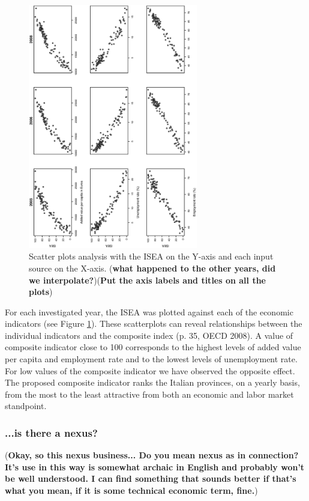 \documentclass[10pt]{article}
\theoremstyle{definition}
\theoremstyle{plain}
\begin{document}
\begin{figure}[tbp]
\centering
	\includegraphics[width=0.66\textwidth, angle=270]{sensitivity.eps}
\caption{Scatter plots analysis with the ISEA on the Y-axis and each input source on the X-axis. (\textbf{what happened to the other years, did we interpolate?})(\textbf{Put the axis labels and titles on all the plots})}
	\label{fig4}
\end{figure}

For each investigated year, the ISEA was plotted against each of the economic indicators  (see Figure \ref{fig4}). These scatterplots can reveal relationships between the individual indicators and the composite index (p. 35, OECD 2008). A value of composite indicator close to 100 corresponds to the highest levels of added value per capita and employment rate and to the lowest levels of unemployment rate. For low values of the composite indicator we have observed the opposite effect. The proposed composite indicator ranks the Italian provinces, on a yearly basis, from the most to the least attractive from both an economic and labor market standpoint.

\subsubsection{...is there a nexus? \label{nexus}}

(\textbf{Okay, so this nexus business... Do you mean nexus as in connection? It's use in this way is somewhat archaic in English and probably won't be well understood. I can find something that sounds better if that's what you mean, if it is some technical economic term, fine.})
\end{document}
